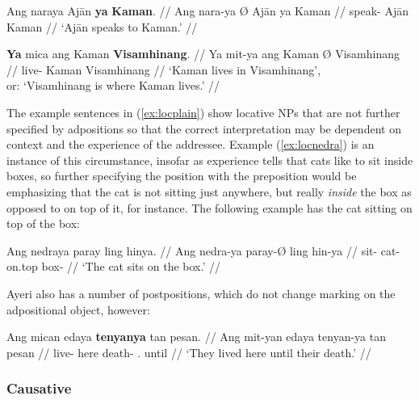 \a\label{ex:locnara}\begingl
	\gla Ang naraya {} Ajān \textbf{ya} \textbf{Kaman}. //
	\glb Ang nara-ya Ø Ajān ya Kaman //
	\glc \AgtT{} speak-\TsgM{} \Top{} Ajān \Loc{} Kaman //
	\glft `Ajān speaks to Kaman.' //
\endgl

\a\label{ex:locmit}\begingl
	\gla \textbf{Ya} mica ang Kaman \textbf{{}} \textbf{Visamhinang}. //
	\glb Ya mit-ya ang Kaman Ø Visamhinang //
	\glc \LocT{} live-\TsgM{} \Aarg{} Kaman \Top{} Visamhinang //
	\glft `Kaman lives in Visamhinang',\\
		or: `Visamhinang is where Kaman lives.' //
\endgl

\xe

The example sentences in (\ref{ex:locplain}) show locative NPs that are not 
further specified by adpositions so that the correct interpretation may be 
dependent on context and the experience of the addressee. Example 
(\ref{ex:locnedra}) is an instance of this circumstance, insofar as experience 
tells that cats like to sit inside boxes, so further specifying the position 
with the preposition  would be emphasizing that the 
cat is not sitting just anywhere, but really \emph{inside} the box as opposed 
to 
on top of it, for instance. The following example has the cat sitting on top of 
the box:

\ex\begingl
	\gla Ang nedraya paray ling hinya. //
	\glb Ang nedra-ya paray-Ø ling hin-ya //
	\glc \AgtT{} sit-\TsgM{} cat-\Top{} on.top box-\Loc{} //
	\glft `The cat sits on the box.' //
\endgl\xe

Ayeri also has a number of postpositions, which do not change marking on the 
adpositional object, however:

\ex\begingl
	\gla Ang mican edaya \textbf{tenyanya} tan pesan. //
	\glb Ang mit-yan edaya tenyan-ya tan pesan //
	\glc \AgtT{} live-\TplM{} here death-\Loc{} \TplM{}.\Gen{} until //
	\glft `They lived here until their death.' //
\endgl\xe


\subsubsection{Causative}

